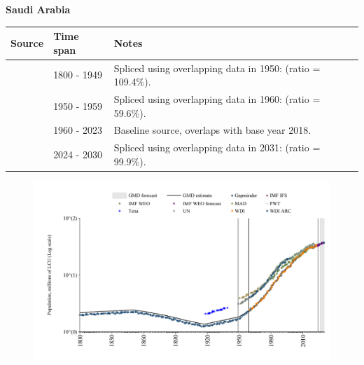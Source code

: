 \documentclass[12pt,a4paper,landscape]{article}
\begin{document}
\begin{adjustbox}{max totalsize={\paperwidth}{\paperheight},center}
\begin{minipage}[t][\textheight][t]{\textwidth}
\vspace*{0.5cm}
{}
\begin{center}
{\Large\bfseries Saudi Arabia}
\end{center}
\vspace{0.5cm}
\begin{table}[H]
\centering
\small
\begin{tabular}{|l|l|l|}
\hline
\textbf{Source} & \textbf{Time span} & \textbf{Notes} \\
\hline
\rowcolor{white}\cite{Gapminder}& 1800 - 1949 &Spliced using overlapping data in 1950: (ratio = 109.4\%).\\
\rowcolor{lightgray}\cite{IMF_IFS}& 1950 - 1959 &Spliced using overlapping data in 1960: (ratio = 59.6\%).\\
\rowcolor{white}\cite{WDI}& 1960 - 2023 &Baseline source, overlaps with base year 2018.\\
\rowcolor{lightgray}\cite{Gapminder}& 2024 - 2030 &Spliced using overlapping data in 2031: (ratio = 99.9\%).\\
\hline
\end{tabular}
\end{table}
\begin{figure}[H]
\centering
\includegraphics[width=\textwidth,height=0.6\textheight,keepaspectratio]{graphs/SAU_pop.pdf}
\end{figure}
\end{minipage}
\end{adjustbox}
\end{document}
